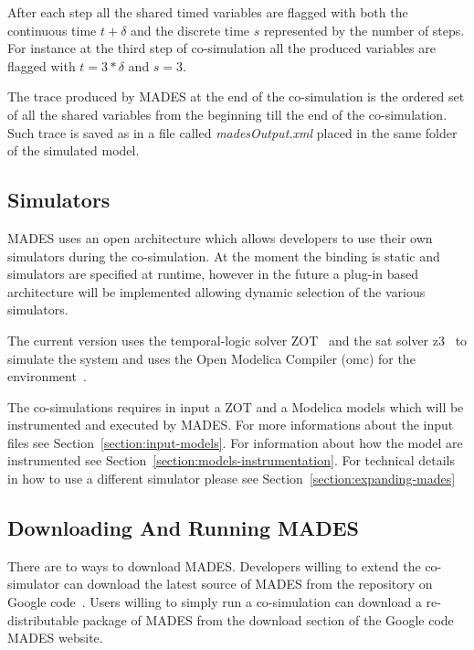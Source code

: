 \documentclass{kapproc} %
\begin{document}
After each step all the shared timed variables are flagged with
both the continuous time $t + \delta$ and the discrete time $s$ represented 
by the number of steps. For instance at the third step of co-simulation all the produced variables are flagged with $t = 3*\delta$ and $s = 3$.

The trace produced by MADES at the end of the co-simulation is the ordered 
set of all the shared variables from the beginning till the end of the co-simulation. Such trace is saved as in a file called \emph{madesOutput.xml} placed in the same folder of the simulated model.

\subsection{Simulators}

MADES uses an open architecture which allows developers to use their own
simulators during the co-simulation. At the moment the binding is static
and simulators are specified at runtime, however in the future a plug-in based architecture will be implemented allowing dynamic selection of the various
simulators.

The current version uses the temporal-logic solver ZOT~\cite{zotSolver} and 
the sat solver z3~\cite{z3SatSolver} to simulate the system and uses the Open Modelica Compiler (omc) for the environment~\cite{Fritzson05theopenmodelica}.

The co-simulations requires in input a ZOT and a Modelica models which will be instrumented and executed by MADES. For more informations about the input files see Section~\ref{section:input-models}. For information about how the model are instrumented see Section~\ref{section:models-instrumentation}. For technical
details in how to use a different simulator please see Section~\ref{section:expanding-mades}

\subsection{Downloading And Running MADES}

There are to ways to download MADES. Developers willing to extend the 
co-simulator can download the latest 
source of MADES from the repository on Google code~\cite{MadesSvn}. 
Users willing to simply run a co-simulation can download a re-distributable
package of MADES from the download section of the Google code MADES 
website.
\end{document}
